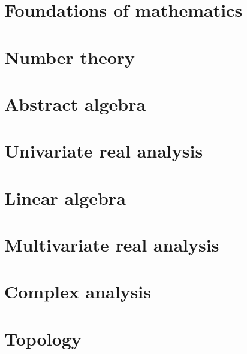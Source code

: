 \part{Foundations of mathematics}




\part{Number theory}







\part{Abstract algebra}




\part{Univariate real analysis}






\part{Linear algebra}









\part{Multivariate real analysis}






\part{Complex analysis}



\part{Topology}










